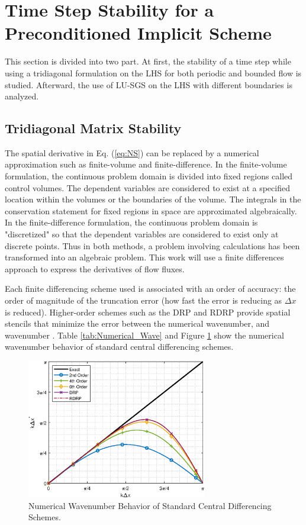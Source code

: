 \documentclass[conf]{new-aiaa}
\begin{document}
\section{Time Step Stability for a Preconditioned Implicit Scheme}
\label{sec:Eigenvalue}
This section is divided into two part. 
At first, the stability of a time step while using a tridiagonal formulation on the LHS for both periodic and bounded flow is studied. 
Afterward, the use of LU-SGS on the LHS with different boundaries is analyzed. 

\subsection{Tridiagonal Matrix Stability}
\label{subsec:TriDi}
The spatial derivative in Eq. (\ref{eq:NS}) can be replaced by a numerical approximation such as finite-volume and finite-difference.
In the finite-volume formulation, the continuous problem domain is divided into fixed regions called control volumes. 
The dependent variables are considered to exist at a specified location within the volumes or the boundaries of the volume. 
The integrals in the conservation statement for fixed regions in space are approximated algebraically. 
In the finite-difference formulation, the continuous problem domain is "discretized" so that the dependent variables are considered to exist only at discrete points. 
Thus in both methods, a problem involving calculations has been transformed into an algebraic problem.
This work will use a finite differences approach to express the derivatives of flow fluxes. 

Each finite differencing scheme used is associated with an order of accuracy: the order of magnitude of the truncation error (how fast the error is reducing as $\Delta{x}$ is reduced).
Higher-order schemes such as the DRP and RDRP provide spatial stencils that minimize the error between the numerical wavenumber, and wavenumber \cite{DRP, RDRP}. 
Table \ref{tab:Numerical_Wave} and Figure \ref{fig:Num_wave} show the numerical wavenumber behavior of standard central differencing schemes.

\begin{figure}[htp!]
    \begin{center}
    \includegraphics[width=0.7\textwidth]{Figures/Numerical_Wave.eps}
        \caption[Numerical wavenumber behavior] {Numerical Wavenumber Behavior of Standard Central Differencing Schemes. \label{fig:Num_wave}}
    \end{center}
\end{figure}
\end{document}

